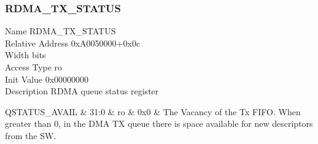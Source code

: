 \documentclass[10pt,a4paper]{paper}
\begin{document}
\subsubsection{RDMA\_TX\_STATUS} \label{reg:rdma_tx_status}
\begin{regdescription}
	Name			\> RDMA\_TX\_STATUS\\
	Relative Address	\> 0xA0050000+0x0c\\
	Width			 bits\\
	Access Type		\> ro\\
	Init Value		\> 0x00000000\\
	Description		\> RDMA queue status register\\
\end{regdescription}
\begin{regdetails}
	\hline QSTATUS\_AVAIL & 31:0 & ro & 0x0 & The Vacancy of the Tx FIFO.
	When greater than 0, in the DMA TX queue there is space available for
	new descriptors from the SW.\\
\end{regdetails}
\end{document}
